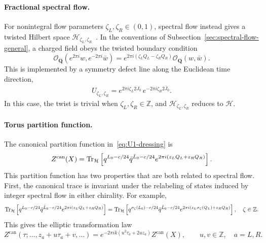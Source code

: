 \documentclass[11pt]{article}
\numberwithin{equation}{section}
\begin{document}
\paragraph{Fractional spectral flow.}
For nonintegral flow parameters $\zeta_L,\zeta_R\in(0,1)$, spectral flow instead gives a twisted Hilbert space $\mathcal H_{\zeta_L,\zeta_R}$~\cite{Schwimmer:1986mf,Benjamin:2020swg}. In the conventions of Subsection~\ref{sec:spectral-flow-general}, a charged field obeys the twisted boundary condition
\begin{equation}
\mathcal O_{\mathbf Q}(e^{2\pi i}w,e^{-2\pi i}\bar w)
 =e^{2\pi i(\zeta_LQ_L-\zeta_RQ_R)}
 \mathcal O_{\mathbf Q}(w,\bar w).
\end{equation}
This is implemented by a symmetry defect line along the Euclidean time direction,
\begin{align}
    U_{\zeta_L,\zeta_R}=e^{2\pi i\zeta_L 2J_0}\,e^{-2\pi i\zeta_R2\bar J_0}.
\end{align}
In this case, the twist is trivial when $\zeta_L,\zeta_R\in\mathbb{Z}$, and $\mathcal H_{\zeta_L,\zeta_R}$ reduces to $\mathcal{H}$. 

\paragraph{Torus partition function.}
The canonical partition function in~\eqref{eq:U1-dressing}  is
\begin{equation}
Z^{\mathrm{can}}(X)=\operatorname{Tr}_{\mathcal H}
 \left[q^{L_0-c/24}\bar q^{\bar L_0-c/24}
 e^{2\pi i(z_LQ_L+z_RQ_R)}\right].
\label{eq:U1-Z-def}
\end{equation}
This partition function has two properties that are both related to spectral flow.
First, the canonical trace is invariant under the relabeling of states induced by integer spectral flow in either chirality. For example,
\begin{align}
   \operatorname{Tr}_{\mathcal H}
 \left[q^{L_0-c/24}\bar q^{\bar L_0-c/24}
 e^{2\pi i(z_LQ_L+z_RQ_R)}\right]= \operatorname{Tr}_{\mathcal H}
 \left[q^{\sigma_{\zeta}(L_0)-c/24}\bar q^{\bar L_0-c/24}
 e^{2\pi i(z_L \sigma_{\zeta}(Q_L)+z_RQ_R)}\right], \quad \zeta \in \mathbb{Z}.
\end{align}
This gives the elliptic transformation law
\begin{equation}
Z^{\mathrm{can}}(\tau;\ldots,z_a+u\tau_a+v,\ldots)
 =e^{-2\pi ik(u^2\tau_a+2uz_a)}Z^{\mathrm{can}}(X),
 \qquad u,v\in\mathbb Z,\quad a=L,R.
\label{U(1)_elliptic}
\end{equation}
\end{document}
